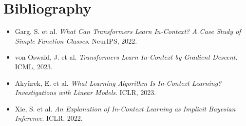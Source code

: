 \documentclass[11pt,a4paper,oneside,openany]{memoir}
\theoremstyle{definition}
\begin{document}
\chapter*{Bibliography}
\begin{itemize}
\item Garg, S. et al. \emph{What Can Transformers Learn In-Context? A Case Study of Simple Function Classes}. NeurIPS, 2022.
\item von Oswald, J. et al. \emph{Transformers Learn In-Context by Gradient Descent}. ICML, 2023.
\item Aky\"urek, E. et al. \emph{What Learning Algorithm Is In-Context Learning? Investigations with Linear Models}. ICLR, 2023.
\item Xie, S. et al. \emph{An Explanation of In-Context Learning as Implicit Bayesian Inference}. ICLR, 2022.
\end{itemize}
\end{document}
